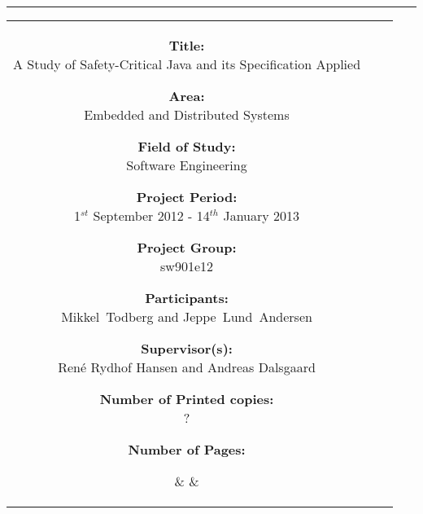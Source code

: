 \begin{titlepage}

\begin{center}
\begin{tabular}{c}
\end{tabular}
\end{center}
\vspace{-3mm}
\hrule

\vspace{5mm}

\hspace{-10mm}
\begin{tabular}{ccc}

\parbox{45mm}{
  \footnotesize
  \begin{description}
  
  \item{\textbf{Title:}          \\ A Study of Safety-Critical Java and its Specification Applied}
  \item{\textbf{Area:}           \\ Embedded and Distributed Systems}
  \item{\textbf{Field of Study:} \\ Software Engineering}
  \item{\textbf{Project Period:} \\ 1$^{st}$ September 2012 - 14$^{th}$ January 2013}
  \item{\textbf{Project Group:}  \\ sw901e12}
  \item{\textbf{Participants:}   \\ Mikkel~Todberg and Jeppe~Lund~Andersen}
  \item{\textbf{Supervisor(s):}  \\ Ren\'{e} Rydhof Hansen and Andreas Dalsgaard}

  \item{\textbf{Number of Printed copies:} \\ ?}
  \item{\textbf{Number of Pages:} \\ \pageref{LastPage}}

  \end{description}
}

&
\hspace{5mm}
&

\fbox{
  \parbox{65mm}{
    \footnotesize
    
  }
}

\end{tabular}

\end{titlepage}
